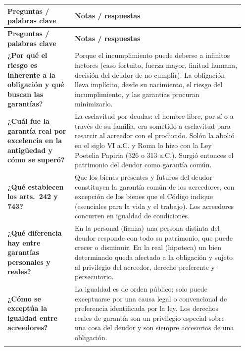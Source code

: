 \documentclass[12pt,oneside]{book}
\makeatletter
\newenvironment{cornell}{%
    \par\vspace{0.5em}
    \noindent
    \begin{longtable}{@{}>{\raggedright\arraybackslash}p{0.27\linewidth}
                         >{\raggedright\arraybackslash}p{0.68\linewidth}@{}}
    \toprule
    \textbf{Preguntas / palabras clave} & \textbf{Notas / respuestas} \\
    \midrule
    \endfirsthead
    \toprule
    \textbf{Preguntas / palabras clave} & \textbf{Notas / respuestas} \\
    \midrule
    \endhead
}{%
    \bottomrule
    \end{longtable}
}
\newcommand{\cornellsummary}[1]{%
    \midrule
    \multicolumn{2}{@{}p{\dimexpr0.95\linewidth+2\tabcolsep\relax}@{}}{%
        \vspace{0.2em}\textbf{Resumen:} #1\vspace{0.2em}} \\
}
\makeatother
\begin{document}
\begin{cornell}
\textbf{¿Por qué el riesgo es inherente a la obligación y qué buscan las garantías?} &
Porque el incumplimiento puede deberse a infinitos factores (caso fortuito, fuerza mayor, finitud humana, decisión del deudor de no cumplir). La obligación lleva implícito, desde su nacimiento, el riesgo del incumplimiento, y las garantías procuran minimizarlo. \\

\textbf{¿Cuál fue la garantía real por excelencia en la antigüedad y cómo se superó?} &
La esclavitud por deudas: el hombre libre, por sí o a través de su familia, era sometido a esclavitud para resarcir al acreedor con el producido. Solón la abolió en el siglo VI a.C. y Roma lo hizo con la Ley Poetelia Papiria (326 o 313 a.C.). Surgió entonces el patrimonio del deudor como garantía común. \\

\textbf{¿Qué establecen los arts.~242 y 743?} &
Que los bienes presentes y futuros del deudor constituyen la garantía común de los acreedores, con excepción de los bienes que el Código indique (esenciales para la vida y el trabajo). Los acreedores concurren en igualdad de condiciones. \\

\textbf{¿Qué diferencia hay entre garantías personales y reales?} &
En la personal (fianza) una persona distinta del deudor responde con todo su patrimonio, que puede crecer o disminuir. En la real (hipoteca) un bien determinado queda afectado a la obligación y sujeto al privilegio del acreedor, derecho preferente y persecutorio. \\

\textbf{¿Cómo se exceptúa la igualdad entre acreedores?} &
La igualdad es de orden público; solo puede exceptuarse por una causa legal o convencional de preferencia identificada por la ley. Los derechos reales de garantía son un privilegio especial sobre una cosa del deudor y son siempre accesorios de una obligación. \\

\cornellsummary{Las garantías buscan minimizar el riesgo de incumplimiento inherente a toda obligación. Tras la abolición de la esclavitud por deudas, el patrimonio del deudor pasó a ser la garantía común de los acreedores (arts.~242 y 743), con igualdad entre ellos como regla de orden público. Los derechos reales de garantía son accesorios y otorgan un privilegio especial sobre una cosa determinada, a diferencia de las garantías personales.}
\end{cornell}
\end{document}
